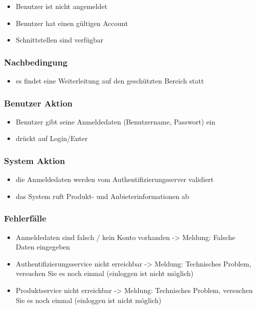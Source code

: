 \documentclass[a4paper,12pt]{article}
\begin{document}
\begin{itemize}
\item
  Benutzer ist nicht angemeldet
\item
  Benutzer hat einen gültigen Account
\item
  Schnittstellen sind verfügbar
\end{itemize}

\subsubsection{Nachbedingung}\label{nachbedingung}

\begin{itemize}
\item
  es findet eine Weiterleitung auf den geschützten Bereich statt
\end{itemize}

\subsubsection{Benutzer Aktion}\label{benutzer-aktion}

\begin{itemize}
\item
  Benutzer gibt seine Anmeldedaten (Benutzername, Passwort) ein
\item
  drückt auf Login/Enter
\end{itemize}

\subsubsection{System Aktion}\label{system-aktion}

\begin{itemize}
\item
  die Anmeldedaten werden vom Authentifizierungsserver validiert
\item
  das System ruft Produkt- und Anbieterinformationen ab
\end{itemize}

\subsubsection{Fehlerfälle}\label{fehlerfalle}

\begin{itemize}
\item
  Anmeldedaten sind falsch / kein Konto vorhanden -\textgreater{}
  Meldung: Falsche Daten eingegeben
\item
  Authentifizierungsservice nicht erreichbar -\textgreater{} Meldung:
  Technisches Problem, versuchen Sie es noch einmal (einloggen ist nicht
  möglich)
\item
  Produktservice nicht erreichbar -\textgreater{} Meldung: Technisches
  Problem, versuchen Sie es noch einmal (einloggen ist nicht möglich)
\end{itemize}
\end{document}
